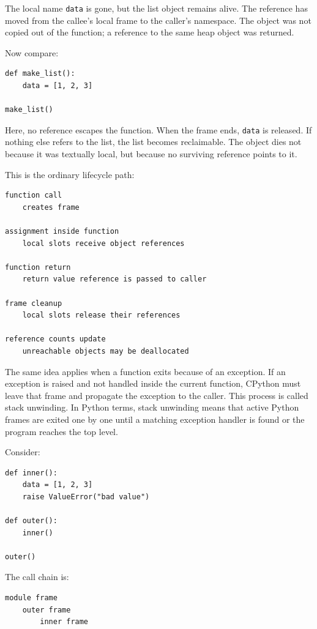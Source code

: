 The local name \texttt{data} is gone, but the list object remains alive. The reference has moved from the callee's local frame to the caller's namespace. The object was not copied out of the function; a reference to the same heap object was returned.

Now compare:

\begin{verbatim}
def make_list():
    data = [1, 2, 3]

make_list()
\end{verbatim}

Here, no reference escapes the function. When the frame ends, \texttt{data} is released. If nothing else refers to the list, the list becomes reclaimable. The object dies not because it was textually local, but because no surviving reference points to it.

This is the ordinary lifecycle path:

\begin{verbatim}
function call
    creates frame

assignment inside function
    local slots receive object references

function return
    return value reference is passed to caller

frame cleanup
    local slots release their references

reference counts update
    unreachable objects may be deallocated
\end{verbatim}

The same idea applies when a function exits because of an exception. If an exception is raised and not handled inside the current function, CPython must leave that frame and propagate the exception to the caller. This process is called stack unwinding. In Python terms, stack unwinding means that active Python frames are exited one by one until a matching exception handler is found or the program reaches the top level.

Consider:

\begin{verbatim}
def inner():
    data = [1, 2, 3]
    raise ValueError("bad value")

def outer():
    inner()

outer()
\end{verbatim}

The call chain is:

\begin{verbatim}
module frame
    outer frame
        inner frame
\end{verbatim}

